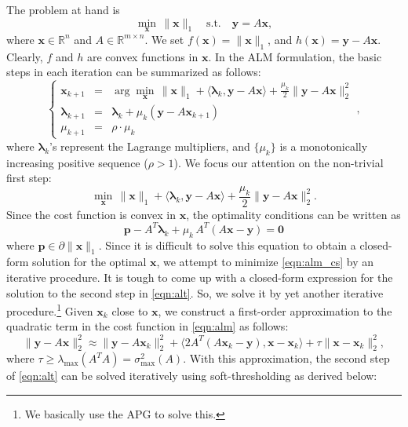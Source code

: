 \documentclass{article}
\newcommand{\x}{\mathbf{x}}
\newcommand{\y}{\mathbf{y}}
\newcommand{\R}{\mathbb{R}}
\newcommand{\bl}{\boldsymbol{\lambda}}
\newcommand{\p}{\mathbf{p}}
\begin{document}
The problem at hand is 
\begin{equation}
\min_{\x} \, \|\x\|_1 \quad \mathrm{s.t.} \quad \y = A\x,
\end{equation}
where $\x \in \R^n$ and $A \in \R^{m\times n}$. 
\smallbreak
We set $f(\x) = \|\x\|_1$, and $h(\x) = \y - A\x$. Clearly, $f$ and $h$ are convex functions in $\x$. In the ALM formulation, the basic steps in each iteration can be summarized as follows:
\begin{equation}
\left \{ 
\begin{array}{lll}
\x_{k+1} & = & \arg\min_{\x} \, \|\x\|_1 + \langle \bl_k, \y - A\x \rangle + \frac{\mu_k}{2}\|\y - A\x\|_2^2 \\
\bl_{k+1} & = & \bl_k + \mu_k (\y - A\x_{k+1}) \\
\mu_{k+1} & = & \rho\cdot\mu_k
\end{array} 
\right . ,
\end{equation}
where $\bl_k$'s represent the Lagrange multipliers, and $\{\mu_k\}$ is a monotonically increasing positive sequence ($\rho > 1$).
\smallbreak
We focus our attention on the non-trivial first step:
\begin{equation}
\min_{\x} \, \|\x\|_1 + \langle \bl_k, \y - A\x \rangle + \frac{\mu_k}{2}\|\y - A\x\|_2^2.
\label{eqn:alm_cs}
\end{equation}
Since the cost function is convex in $\x$, the optimality conditions can be written as
\begin{equation}
\p - A^T\bl_k + \mu_k\,A^T(A\x - \y) = \mathbf{0}
\end{equation}
where $\p \in \partial \|\x\|_1$. Since it is difficult to solve this equation to obtain a closed-form solution for the optimal $\x$, we attempt to minimize \eqref{eqn:alm_cs} by an iterative procedure. 
\smallbreak
It is tough to come up with a closed-form expression for the solution to the second step in \eqref{eqn:alt}. So, we solve it by yet another iterative procedure.\footnote{We basically use the APG to solve this.} Given $\x_k$ close to $\x$, we construct a first-order approximation to the quadratic term in the cost function in \eqref{eqn:alm} as follows:
\begin{equation}
\|\y - A\x\|_2^2 \approx \|\y - A\x_k\|_2^2 + \langle 2A^T(A\x_k-\y), \x - \x_k \rangle + \tau\|\x-\x_k\|_2^2,
\end{equation}
where $\tau \geq \lambda_\mathrm{max} (A^TA) = \sigma^2_\mathrm{max}(A)$. With this approximation, the second step of \eqref{eqn:alt} can be solved iteratively using soft-thresholding as derived below:
\end{document}
